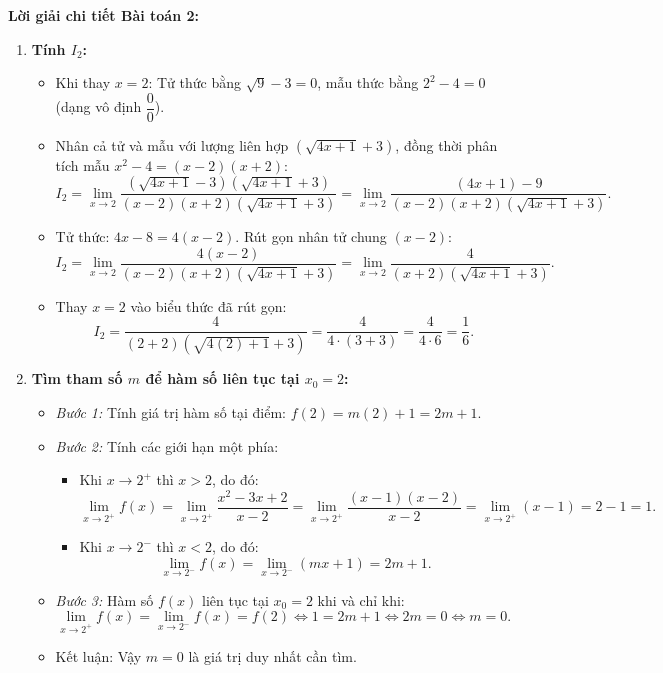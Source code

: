 \documentclass[12pt, a4paper]{article}
\begin{document}
\noindent \textbf{Lời giải chi tiết Bài toán 2:}
\begin{enumerate}[leftmargin=0.6cm]
    \item \textbf{Tính $I_2$:}
    \begin{itemize}
        \item Khi thay $x = 2$: Tử thức bằng $\sqrt{9} - 3 = 0$, mẫu thức bằng $2^2 - 4 = 0$ (dạng vô định $\dfrac{0}{0}$).
        \item Nhân cả tử và mẫu với lượng liên hợp $(\sqrt{4x + 1} + 3)$, đồng thời phân tích mẫu $x^2 - 4 = (x - 2)(x + 2)$:
        $$I_2 = \lim_{x \to 2} \dfrac{(\sqrt{4x + 1} - 3)(\sqrt{4x + 1} + 3)}{(x - 2)(x + 2)(\sqrt{4x + 1} + 3)} = \lim_{x \to 2} \dfrac{(4x + 1) - 9}{(x - 2)(x + 2)(\sqrt{4x + 1} + 3)}.$$
        \item Tử thức: $4x - 8 = 4(x - 2)$. Rút gọn nhân tử chung $(x - 2)$:
        $$I_2 = \lim_{x \to 2} \dfrac{4(x - 2)}{(x - 2)(x + 2)(\sqrt{4x + 1} + 3)} = \lim_{x \to 2} \dfrac{4}{(x + 2)(\sqrt{4x + 1} + 3)}.$$
        \item Thay $x = 2$ vào biểu thức đã rút gọn:
        $$I_2 = \dfrac{4}{(2 + 2)(\sqrt{4(2) + 1} + 3)} = \dfrac{4}{4 \cdot (3 + 3)} = \dfrac{4}{4 \cdot 6} = \dfrac{1}{6}.$$
    \end{itemize}
    \item \textbf{Tìm tham số $m$ để hàm số liên tục tại $x_0 = 2$:}
    \begin{itemize}
        \item \textit{Bước 1:} Tính giá trị hàm số tại điểm: $f(2) = m(2) + 1 = 2m + 1$.
        \item \textit{Bước 2:} Tính các giới hạn một phía:
        \begin{itemize}
            \item Khi $x \to 2^+$ thì $x > 2$, do đó:
            $$\lim_{x \to 2^+} f(x) = \lim_{x \to 2^+} \dfrac{x^2 - 3x + 2}{x - 2} = \lim_{x \to 2^+} \dfrac{(x - 1)(x - 2)}{x - 2} = \lim_{x \to 2^+} (x - 1) = 2 - 1 = 1.$$
            \item Khi $x \to 2^-$ thì $x < 2$, do đó:
            $$\lim_{x \to 2^-} f(x) = \lim_{x \to 2^-} (mx + 1) = 2m + 1.$$
        \end{itemize}
        \item \textit{Bước 3:} Hàm số $f(x)$ liên tục tại $x_0 = 2$ khi và chỉ khi:
        $$\lim_{x \to 2^+} f(x) = \lim_{x \to 2^-} f(x) = f(2) \iff 1 = 2m + 1 \iff 2m = 0 \iff m = 0.$$
        \item Kết luận: Vậy $m = 0$ là giá trị duy nhất cần tìm.
    \end{itemize}
\end{enumerate}
\end{document}
